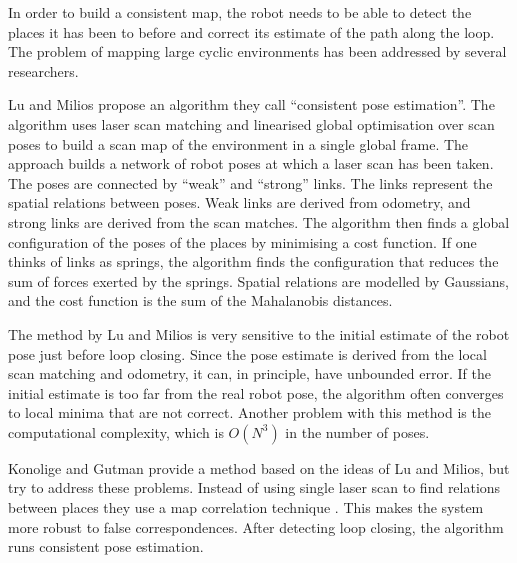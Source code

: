 
In order to build a consistent map, the robot needs to be able to
detect the places it has been to before and correct its estimate of
the path along the loop. The problem of mapping large cyclic
environments has been addressed by several researchers.




Lu and Milios \cite{lu97:_global} propose an algorithm they call
``consistent pose estimation''. The algorithm uses laser scan matching
and linearised global optimisation over scan poses to build a scan map
of the environment in a single global frame. The approach builds a
network of robot poses at which a laser scan has been taken. The poses
are connected by ``weak'' and ``strong'' links. The links represent
the spatial relations between poses. Weak links are derived from
odometry, and strong links are derived from the scan matches. The
algorithm then finds a global configuration of the poses of the places
by minimising a cost function. If one thinks of links as springs, the
algorithm finds the configuration that reduces the sum of forces
exerted by the springs. Spatial relations are modelled by Gaussians,
and the cost function is the sum of the Mahalanobis distances.

The method by Lu and Milios is very sensitive to the initial estimate
of the robot pose just before loop closing. Since the pose estimate is
derived from the local scan matching and odometry, it can, in
principle, have unbounded error. If the initial estimate is too far
from the real robot pose, the algorithm often converges to local
minima that are not correct. Another problem with this method is the
computational complexity, which is $O(N^3)$ in the number of poses.

Konolige and Gutman
\cite{konolige99:_increm_mappin_large_cyclic_envir} provide a method
based on the ideas of Lu and Milios, but try to address these
problems. Instead of using single laser scan to find relations between
places they use a map correlation technique \cite{konolige99}. This
makes the system more robust to false correspondences. After detecting
loop closing, the algorithm runs consistent pose estimation. 

